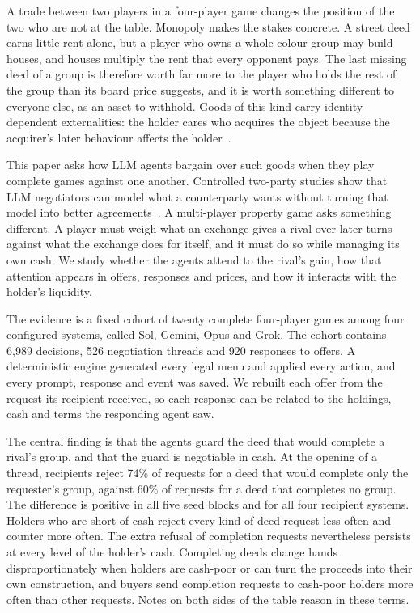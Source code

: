 \documentclass[11pt,letterpaper]{article}
\begin{document}
A trade between two players in a four-player game changes the position of the two who are not at the table. Monopoly makes the stakes concrete. A street deed earns little rent alone, but a player who owns a whole colour group may build houses, and houses multiply the rent that every opponent pays. The last missing deed of a group is therefore worth far more to the player who holds the rest of the group than its board price suggests, and it is worth something different to everyone else, as an asset to withhold. Goods of this kind carry identity-dependent externalities: the holder cares who acquires the object because the acquirer's later behaviour affects the holder~\citep{jehiel1995delay,jehiel1996nuclear}.

This paper asks how LLM agents bargain over such goods when they play complete games against one another. Controlled two-party studies show that LLM negotiators can model what a counterparty wants without turning that model into better agreements~\citep{cosentino2026counterparty}. A multi-player property game asks something different. A player must weigh what an exchange gives a rival over later turns against what the exchange does for itself, and it must do so while managing its own cash. We study whether the agents attend to the rival's gain, how that attention appears in offers, responses and prices, and how it interacts with the holder's liquidity.

The evidence is a fixed cohort of twenty complete four-player games among four configured systems, called Sol, Gemini, Opus and Grok. The cohort contains 6,989 decisions, 526 negotiation threads and 920 responses to offers. A deterministic engine generated every legal menu and applied every action, and every prompt, response and event was saved. We rebuilt each offer from the request its recipient received, so each response can be related to the holdings, cash and terms the responding agent saw.

The central finding is that the agents guard the deed that would complete a rival's group, and that the guard is negotiable in cash. At the opening of a thread, recipients reject 74\% of requests for a deed that would complete only the requester's group, against 60\% of requests for a deed that completes no group. The difference is positive in all five seed blocks and for all four recipient systems. Holders who are short of cash reject every kind of deed request less often and counter more often. The extra refusal of completion requests nevertheless persists at every level of the holder's cash. Completing deeds change hands disproportionately when holders are cash-poor or can turn the proceeds into their own construction, and buyers send completion requests to cash-poor holders more often than other requests. Notes on both sides of the table reason in these terms.
\end{document}

